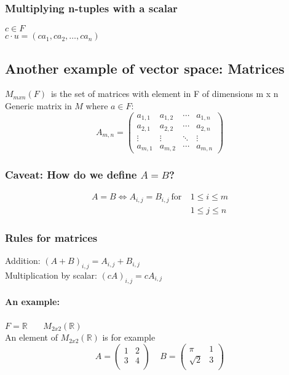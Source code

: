 \documentclass[11pt]{scrartcl}
\begin{document}
\subsubsection{Multiplying n-tuples with a scalar}
$c \in F$\\
$c \cdot u = (ca_1, ca_2,\dots, ca_n) $

\subsection{Another example of vector space: Matrices}
$M_{mxn}(F)$\ is the set of matrices with element in F of dimensions m x n\\
Generic matrix in $M$ where $a \in F$:
\begin{equation*}
A_{m,n} = 
\begin{pmatrix}
a_{1,1} & a_{1,2} & \cdots & a_{1,n} \\
a_{2,1} & a_{2,2} & \cdots & a_{2,n} \\
\vdots  & \vdots  & \ddots & \vdots  \\
a_{m,1} & a_{m,2} & \cdots & a_{m,n} 
\end{pmatrix}
\end{equation*}

\subsubsection{Caveat: How do we define $A = B$?}
\begin{equation*}
\begin{split}
	A = B \Leftrightarrow A_{i,j} = B_{i,j} \ \text{for} \ & 1 \leq i \leq m\\
													   & 1 \leq j \leq n
\end{split}
\end{equation*}

\subsubsection{Rules for matrices}
Addition: $(A + B)_{i,j} = A_{i,j} + B_{i,j}$\\
Multiplication by scalar: $(cA)_{i,j} = cA_{i,j}$

\paragraph{An example:}
$F = \mathbb{R}$ \ \ \ $M_{2x2}(\mathbb{R})$\\
An element of $M_{2x2}(\mathbb{R})$ is for example 
\begin{equation*}
A= 
\begin{pmatrix}
1 & 2 \\
3 & 4 \\
\end{pmatrix}
\ \ \ \ \  B= 
\begin{pmatrix}
\pi & 1\\
\sqrt{2} & 3\\
\end{pmatrix}
\end{equation*}
\end{document}
